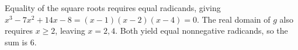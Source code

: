 Equality of the square roots requires equal radicands, giving $x^3-7x^2+14x-8=(x-1)(x-2)(x-4)=0$. The real domain of $g$ also requires $x\ge 2$, leaving $x=2,4$. Both yield equal nonnegative radicands, so the sum is $\boxed 6$.
